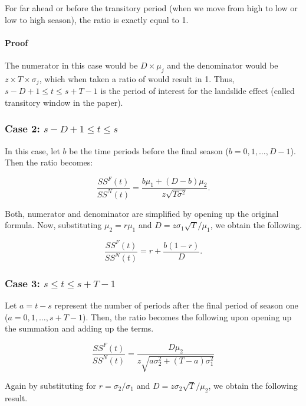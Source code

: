 \documentclass[,msom,nonblindrev]{informs}
\begin{document}
For far ahead or before the transitory period (when we move from high to
low or low to high season), the ratio is exactly equal to 1.

\hypertarget{proof}{%
\paragraph{Proof}\label{proof}}

The numerator in this case would be \(D \times \mu_j\) and the
denominator would be \(z \times T \times \sigma_j\), which when taken a
ratio of would result in 1. Thus, \(s-D+1 \leq t \leq s+T-1\) is the
period of interest for the landslide effect (called transitory window in
the paper).

\hypertarget{case-2-s---d-1-leq-t-leq-s}{%
\subsubsection{\texorpdfstring{Case 2:
\(s - D + 1 \leq t \leq s\)}{Case 2: s - D + 1 \textbackslash leq t \textbackslash leq s}}\label{case-2-s---d-1-leq-t-leq-s}}

In this case, let \(b\) be the time periods before the final season
(\(b = 0, 1, …, D-1\)). Then the ratio becomes:

\[
\frac{SS^F(t)}{SS^N(t)} = \frac{b \mu_1 + (D-b)\mu_2}{z \sqrt{T \sigma^2}}.
\]

Both, numerator and denominator are simplified by opening up the
original formula. Now, substituting \(\mu_2 = r \mu_1\) and
\(D = z\sigma_1\sqrt{T}/\mu_1\), we obtain the following.

\[
\frac{SS^F(t)}{SS^N(t)} = r + \frac{b(1-r)}{D}.
\]

\hypertarget{case-3-s-leq-t-leq-st-1}{%
\subsubsection{\texorpdfstring{Case 3:
\(s \leq t \leq s+T-1\)}{Case 3: s \textbackslash leq t \textbackslash leq s+T-1}}\label{case-3-s-leq-t-leq-st-1}}

Let \(a = t-s\) represent the number of periods after the final period
of season one (\(a = 0, 1, …, s+T-1\)). Then, the ratio becomes the
following upon opening up the summation and adding up the terms.

\[
\frac{SS^F(t)}{SS^N(t)} = \frac{D\mu_2}{z\sqrt{a\sigma_2^2 + (T-a)\sigma_1^2}}
\]

Again by substituting for \(r = \sigma_2/\sigma_1\) and
\(D = z\sigma_2\sqrt{T}/\mu_2\), we obtain the following result.
\end{document}
